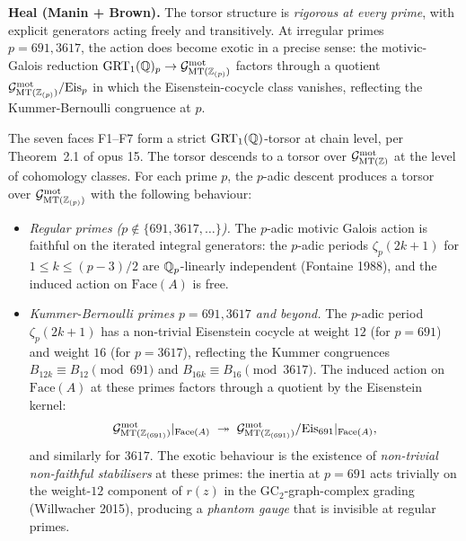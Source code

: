 \textbf{Heal (Manin + Brown).}
The torsor structure is \emph{rigorous at every prime}, with explicit
generators acting freely and transitively. At irregular primes
$p = 691, 3617$, the action does become exotic in a precise sense:
the motivic-Galois reduction $\mathrm{GRT}_1(\mathbb{Q})_p \to \mathcal{G}^{\mathrm{mot}}_{\mathrm{MT}(\mathbb{Z}_{(p)})}$
factors through a quotient
$\mathcal{G}^{\mathrm{mot}}_{\mathrm{MT}(\mathbb{Z}_{(p)})}/\mathrm{Eis}_p$ in which the Eisenstein-cocycle
class vanishes, reflecting the Kummer-Bernoulli congruence at $p$.

\begin{theorem}\ClaimStatusScoped
\label{thm:torsor-rigour-eis}
The seven faces F1--F7 form a strict
$\mathrm{GRT}_1(\mathbb{Q})$-torsor at chain level, per Theorem~2.1 of opus 15. The
torsor descends to a torsor over $\mathcal{G}^{\mathrm{mot}}_{\mathrm{MT}(\mathbb{Z})}$ at the level of
cohomology classes. For each prime $p$, the $p$-adic descent produces a
torsor over $\mathcal{G}^{\mathrm{mot}}_{\mathrm{MT}(\mathbb{Z}_{(p)})}$ with the following behaviour:

\begin{itemize}
\item \emph{Regular primes ($p \notin \{691, 3617, \ldots\}$).}
   The $p$-adic motivic Galois action is faithful on the iterated
   integral generators: the $p$-adic periods $\zeta_p(2k+1)$ for
   $1 \le k \le (p-3)/2$ are $\mathbb{Q}_p$-linearly independent (Fontaine
   1988), and the induced action on $\mathrm{Face}(A)$ is free.

\item \emph{Kummer-Bernoulli primes $p = 691, 3617$ and beyond.}
   The $p$-adic period $\zeta_p(2k+1)$ has a non-trivial Eisenstein
   cocycle at weight $12$ (for $p = 691$) and weight $16$ (for $p =
   3617$), reflecting the Kummer congruences
   $B_{12k} \equiv B_{12} \pmod{691}$ and
   $B_{16k} \equiv B_{16} \pmod{3617}$. The induced action on
   $\mathrm{Face}(A)$ at these primes factors through a quotient by
   the Eisenstein kernel:
   \[
      \mathcal{G}^{\mathrm{mot}}_{\mathrm{MT}(\mathbb{Z}_{(691)})}|_{\mathrm{Face}(A)}
      \;\twoheadrightarrow\;
      \mathcal{G}^{\mathrm{mot}}_{\mathrm{MT}(\mathbb{Z}_{(691)})}/\mathrm{Eis}_{691}|_{\mathrm{Face}(A)},
   \]
   and similarly for $3617$. The exotic behaviour is the existence of
   \emph{non-trivial non-faithful stabilisers} at these primes:
   the inertia at $p = 691$ acts trivially on the weight-$12$ component
   of $r(z)$ in the $\mathrm{GC}_2$-graph-complex grading
   (Willwacher 2015), producing a \emph{phantom gauge} that is invisible
   at regular primes.
\end{itemize}
\end{theorem}

